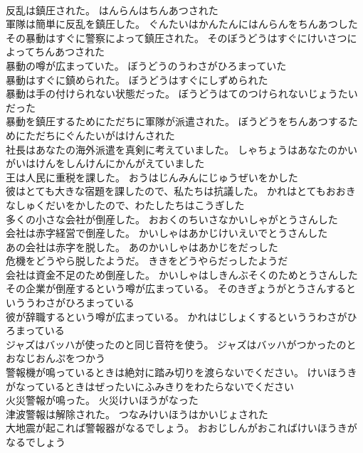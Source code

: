 \documentclass[8pt]{extreport}
\begin{document}
\begin{CJK}{UTF8}{min}
\\	反乱は鎮圧された。	はんらんはちんあつされた 
\\	軍隊は簡単に反乱を鎮圧した。	ぐんたいはかんたんにはんらんをちんあつした 
\\	その暴動はすぐに警察によって鎮圧された。	そのぼうどうはすぐにけいさつによってちんあつされた 
\\	暴動の噂が広まっていた。	ぼうどうのうわさがひろまっていた 
\\	暴動はすぐに鎮められた。	ぼうどうはすぐにしずめられた 
\\	暴動は手の付けられない状態だった。	ぼうどうはてのつけられないじょうたいだった 
\\	暴動を鎮圧するためにただちに軍隊が派遣された。	ぼうどうをちんあつするためにただちにぐんたいがはけんされた 
\\	社長はあなたの海外派遣を真剣に考えていました。	しゃちょうはあなたのかいがいはけんをしんけんにかんがえていました 
\\	王は人民に重税を課した。	おうはじんみんにじゅうぜいをかした 
\\	彼はとても大きな宿題を課したので、私たちは抗議した。	かれはとてもおおきなしゅくだいをかしたので、わたしたちはこうぎした 
\\	多くの小さな会社が倒産した。	おおくのちいさなかいしゃがとうさんした 
\\	会社は赤字経営で倒産した。	かいしゃはあかじけいえいでとうさんした 
\\	あの会社は赤字を脱した。	あのかいしゃはあかじをだっした 
\\	危機をどうやら脱したようだ。	ききをどうやらだっしたようだ 
\\	会社は資金不足のため倒産した。	かいしゃはしきんぶそくのためとうさんした 
\\	その企業が倒産するという噂が広まっている。	そのきぎょうがとうさんするといううわさがひろまっている 
\\	彼が辞職するという噂が広まっている。	かれはじしょくするといううわさがひろまっている 
\\	ジャズはバッハが使ったのと同じ音符を使う。	ジャズはバッハがつかったのとおなじおんぷをつかう 
\\	警報機が鳴っているときは絶対に踏み切りを渡らないでください。	けいほうきがなっているときはぜったいにふみきりをわたらないでください 
\\	火災警報が鳴った。	火災けいほうがなった 
\\	津波警報は解除された。	つなみけいほうはかいじょされた 
\\	大地震が起これば警報器がなるでしょう。	おおじしんがおこればけいほうきがなるでしょう 

\end{CJK}
\end{document}
